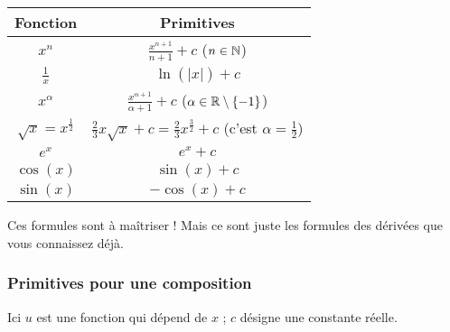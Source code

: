 \documentclass[11pt,class=report,crop=false]{standalone}
\begin{document}
\begin{center}
	\begin{tabular}[t]{|c|c@{\vrule depth 1.2ex height 3ex width 0mm \ }|}
		\hline
		\textbf{Fonction}         & \textbf{Primitives} \\ \hline
		$x^n$          & $\frac{x^{n+1}}{n+1}+c$  \quad ($n \in \mathbb{N}$)   \\ \hline
		$\frac{1}{x}$  & $\ln(|x|)+c$              \\ \hline
		$x^\alpha$     & $\frac{x^{\alpha+1}}{\alpha+1}+c$  \quad ($\alpha \in \mathbb{R}\setminus\{-1\}$)   \\ \hline
		$\sqrt{x}=x^{\frac12}$    & $\frac23x\sqrt{x}+c=\frac23x^{\frac32}+c$  \quad (c'est $\alpha=\frac12$)   \\ \hline
		$e^x$          & $e^x+c$                        \\ \hline
		$\cos(x)$      & $\sin(x)+c$                \\ \hline
		$\sin(x)$      & $-\cos(x)+c$                     \\ \hline
	\end{tabular}
\end{center}

Ces formules sont à maîtriser ! Mais ce sont juste les formules des dérivées que vous connaissez déjà.

\subsubsection*{Primitives pour une composition}

Ici $u$ est une fonction qui dépend de $x$ ; $c$ désigne une constante réelle.
\end{document}
